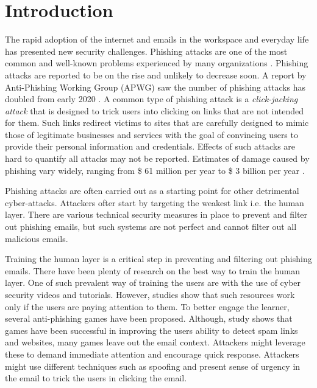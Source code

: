 

\pagestyle{plain} %
\setcounter{page}{1}
\chapter{Introduction}

The rapid adoption of the internet and emails in the workspace and everyday life has presented new security challenges. Phishing attacks are one of the most common and well-known problems experienced by many organizations \cite{jampen}.  Phishing attacks are reported to be on the rise and unlikely to decrease soon. A report by Anti-Phishing Working Group (APWG) saw the number of phishing attacks has doubled from early 2020 \cite{APWG}. A common type of phishing attack is a \emph{click-jacking attack} that is designed to trick users into clicking on links that are not intended for them. Such links redirect victims to sites that are carefully designed to mimic those of legitimate businesses and services with the goal of convincing users to provide their personal information and credentials\cite{jampen}. Effects of such attacks are hard to quantify all attacks may not be reported. Estimates of damage caused by phishing vary widely, ranging from \$ 61 million per year to \$ 3 billion per year \cite{hong_2012}.

Phishing attacks are often carried out as a starting point for other detrimental cyber-attacks\cite{jampen}. Attackers ofter start by targeting the weakest link i.e. the human layer\cite{accenture}. There are various technical security measures in place to prevent and filter out phishing emails\cite{hird, dou}, but such systems are not perfect and cannot filter out all malicious emails.

Training the human layer is a critical step in preventing and filtering out phishing emails. There have been plenty of research on the best way to train the human layer. One of such prevalent way of training the users are with the use of cyber security videos and tutorials. However, studies show that such resources work only if the users are paying attention to them\cite{kumaraguru_sheng_acquisti_cranor_hong_2010}. To better engage the learner, several anti-phishing games have been proposed. Although, study shows that games have been successful in improving the users ability to detect spam links and websites, many games leave out the email context. Attackers might leverage these to demand immediate attention and encourage quick response. Attackers might use different techniques such as spoofing and present sense of urgency in the email to trick the users in clicking the email.

